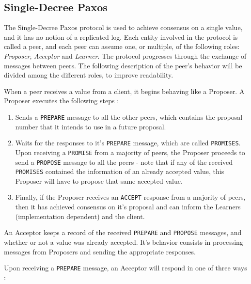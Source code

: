 \subsection{Single-Decree Paxos}

The Single-Decree Paxos protocol \cite{paxos_made_simple} is used to achieve consensus on a single value, and it has no notion of a replicated log. Each entity involved in the protocol is called a peer, and each peer can assume one, or multiple, of the following roles: \textit{Proposer}, \textit{Acceptor} and \textit{Learner}. The protocol progresses through the exchange of messages between peers. The following description of the peer’s behavior will be divided among the different roles, to improve readability.

When a peer receives a value from a client, it begins behaving like a Proposer. A Proposer executes the following steps \cite{paxos_made_simple}:

\begin{enumerate}
  \item Sends a \texttt{PREPARE} message to all the other peers, which contains the proposal number that it intends to use in a future proposal.
  \item Waits for the responses to it’s \texttt{PREPARE} message, which are called \texttt{PROMISES}. Upon receiving a \texttt{PROMISE} from a majority of peers, the Proposer proceeds to send a \texttt{PROPOSE} message to all the peers - note that if any of the received \texttt{PROMISES} contained the information of an already accepted value, this Proposer will have to propose that same accepted value.
  \item Finally, if the Proposer receives an \texttt{ACCEPT} response from a majority of peers, then it has achieved consensus on it’s proposal and can inform the Learners (implementation dependent) and the client.
\end{enumerate}

An Acceptor keeps a record of the received \texttt{PREPARE} and \texttt{PROPOSE} messages, and whether or not a value was already accepted. It’s behavior consists in processing messages from Proposers and sending the appropriate responses.

Upon receiving a \texttt{PREPARE} message, an Acceptor will respond in one of three ways \cite{paxos_made_simple}:

